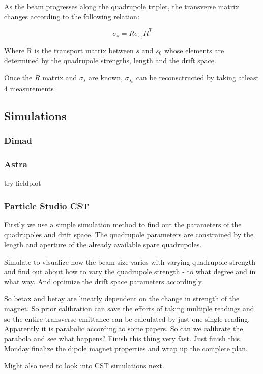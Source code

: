 \documentclass[11pt,a4paper]{article}
\begin{document}
    As the beam progresses along the quadrupole triplet, the transverse matrix changes according to the following relation: 
    
    \begin{equation}
        \sigma_{s} = R \sigma_{s_{0}} R^T
    \end{equation}
    
    Where R is the transport matrix between $s$ and $s_0$ whose elements are determined by the quadrupole strengths, length and the drift space. 
    
    Once the $R$ matrix and $\sigma_s$ are known, $\sigma_{s_0}$ can be reconsctructed by taking atleast 4 measurements 
    
    \subsection{Simulations}
    \subsubsection{Dimad}
    \subsubsection{Astra}
    try fieldplot
    \subsubsection{Particle Studio CST}
    Firstly we use a simple simulation method to find out the parameters of the quadrupoles and  drift space. The quadrupole parameters are constrained by the length and aperture of the already available spare quadrupoles.     
    
    
    Simulate to visualize how the beam size varies with varying quadrupole strength and find out about how to vary the quadrupole strength - to what degree and in what way. And optimize the drift space parameters accordingly.
    
    
    So betax and betay are linearly dependent on the change in strength of the magnet. So prior calibration can save the efforts of taking multiple readings and so the entire transverse emittance can be calculated by just one single reading. Apparently it is parabolic according to some papers. So can we calibrate the parabola and see what happens? Finish this thing very fast. Just finish this. Monday finalize the dipole magnet properties and wrap up the complete plan.   
    
    Might also need to look into CST simulations next. 
    
\end{document}
